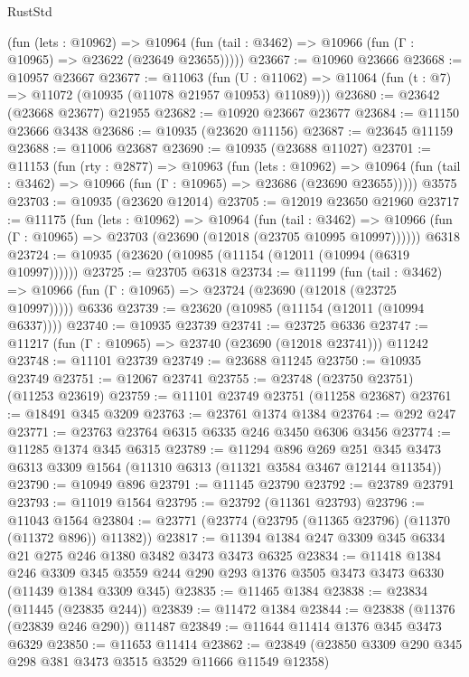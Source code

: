 \begin{lexlean}{RustStd}
\begin{coremodule}
{\begin{coremodule}
{{{{{{{{{{{{{{{{{{{{{{{{{{{{{{{{{{{{{{{{{{{{{{{{{{{{{{{{{{{{{{{{{{{{{{{{{{{{{{{{{{{{{      (fun (lets : @10962) =>
      @10964 (fun (tail : @3462) => @10966 (fun (Γ : @10965) => @23622 (@23649 @23655)))))
@23667 := @10960 @23666
@23668 := @10957 @23667
@23677 := @11063
    (fun (U : @11062) => @11064 (fun (t : @7) => @11072 (@10935 (@11078 @21957 @10953) @11089)))
@23680 := @23642 (@23668 @23677) @21955
@23682 := @10920 @23667 @23677
@23684 := @11150 @23666 @3438
@23686 := @10935 (@23620 @11156)
@23687 := @23645 @11159
@23688 := @11006 @23687
@23690 := @10935 (@23688 @11027)
@23701 := @11153
    (fun (rty : @2877) =>
    @10963
      (fun (lets : @10962) =>
      @10964 (fun (tail : @3462) => @10966 (fun (Γ : @10965) => @23686 (@23690 @23655)))))
    @3575
@23703 := @10935 (@23620 @12014)
@23705 := @12019 @23650 @21960
@23717 := @11175
    (fun (lets : @10962) =>
    @10964
      (fun (tail : @3462) =>
      @10966 (fun (Γ : @10965) => @23703 (@23690 (@12018 (@23705 @10995 @10997))))))
    @6318
@23724 := @10935 (@23620 (@10985 (@11154 (@12011 (@10994 (@6319 @10997))))))
@23725 := @23705 @6318
@23734 := @11199
    (fun (tail : @3462) => @10966 (fun (Γ : @10965) => @23724 (@23690 (@12018 (@23725 @10997)))))
    @6336
@23739 := @23620 (@10985 (@11154 (@12011 (@10994 @6337))))
@23740 := @10935 @23739
@23741 := @23725 @6336
@23747 := @11217 (fun (Γ : @10965) => @23740 (@23690 (@12018 @23741))) @11242
@23748 := @11101 @23739
@23749 := @23688 @11245
@23750 := @10935 @23749
@23751 := @12067 @23741
@23755 := @23748 (@23750 @23751) (@11253 @23619)
@23759 := @11101 @23749 @23751 (@11258 @23687)
@23761 := @18491 @345 @3209
@23763 := @23761 @1374 @1384
@23764 := @292 @247
@23771 := @23763 @23764 @6315 @6335 @246 @3450 @6306 @3456
@23774 := @11285 @1374 @345 @6315
@23789 := @11294
    @896
    @269
    @251
    @345
    @3473
    @6313
    @3309
    @1564
    (@11310 @6313 (@11321 @3584 @3467 @12144 @11354))
@23790 := @10949 @896
@23791 := @11145 @23790
@23792 := @23789 @23791
@23793 := @11019 @1564
@23795 := @23792 (@11361 @23793)
@23796 := @11043 @1564
@23804 := @23771 (@23774 (@23795 (@11365 @23796) (@11370 (@11372 @896)) @11382))
@23817 := @11394 @1384 @247 @3309 @345 @6334 @21 @275 @246 @1380 @3482 @3473 @3473 @6325
@23834 := @11418
    @1384
    @246
    @3309
    @345
    @3559
    @244
    @290
    @293
    @1376
    @3505
    @3473
    @3473
    @6330
    (@11439 @1384 @3309 @345)
@23835 := @11465 @1384
@23838 := @23834 (@11445 (@23835 @244))
@23839 := @11472 @1384
@23844 := @23838 (@11376 (@23839 @246 @290)) @11487
@23849 := @11644 @11414 @1376 @345 @3473 @6329
@23850 := @11653 @11414
@23862 := @23849 (@23850 @3309 @290 @345 @298 @381 @3473 @3515 @3529 @11666 @11549 @12358)
}}}}}}}}}}}}}}}}}}}}}}}}}}}}}}}}}}}}}}}}}}}}}}}}}}}}}}}}}}}}}}}}}}}}}}}}}}}}}}}}}}}}}
\end{coremodule}}
\end{coremodule}
\end{lexlean}
